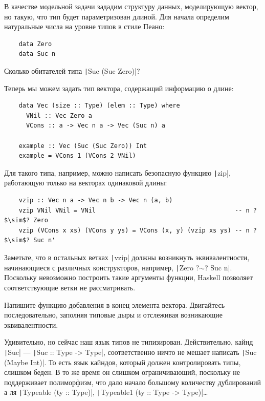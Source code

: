 В качестве модельной задачи зададим структуру данных, моделирующую вектор, но такую, что тип будет параметризован длиной.
Для начала определим натуральные числа на уровне типов в стиле Пеано:
\begin{verbatim}
    data Zero
    data Suc n
\end{verbatim}

\begin{task}
    Сколько обитателей типа \texttt|Suc (Suc Zero)|?
\end{task}

Теперь мы можем задать тип вектора, содержащий информацию о длине:
\begin{verbatim}
    data Vec (size :: Type) (elem :: Type) where
      VNil :: Vec Zero a
      VCons :: a -> Vec n a -> Vec (Suc n) a

    example :: Vec (Suc (Suc Zero)) Int
    example = VCons 1 (VCons 2 VNil)
\end{verbatim}

Для такого типа, например, можно написать безопасную функцию \texttt|zip|, работающую только на векторах одинаковой длины:
\begin{verbatim}
    vzip :: Vec n a -> Vec n b -> Vec n (a, b)
    vzip VNil VNil = VNil                                      -- n ?$\sim$? Zero
    vzip (VCons x xs) (VCons y ys) = VCons (x, y) (vzip xs ys) -- n ?$\sim$? Suc n'
\end{verbatim}

Заметьте, что в остальных ветках \texttt|vzip| должны возникнуть эквивалентности, начинающиеся с различных конструкторов, например, \texttt|Zero ?$\sim$? Suc n|.
Поскольку невозможно построить такие аргументы функции, Haskell позволяет соответствующие ветки не рассматривать.

\begin{task}
    Напишите функцию добавления в конец элемента вектора.
    Двигайтесь последовательно, заполняя типовые дыры и отслеживая возникающие эквивалентности.
\end{task}

Удивительно, но сейчас наш язык типов не типизирован.
Действительно, кайнд \texttt|Suc| --- \texttt|Suc :: Type -> Type|, соответственно ничто не мешает написать \texttt|Suc (Maybe Int)|.
То есть язык кайндов, который должен контролировать типы, слишком беден.
В то же время он слишком ограничивающий, поскольку не поддерживает полиморфизм, что дало начало большому количеству дублирований а ля \texttt|Typeable (ty :: Type)|, \texttt|Typeable1 (ty :: Type -> Type)|\ldots


